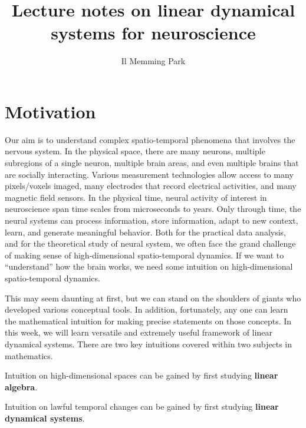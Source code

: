 \documentclass[a4paper,11pt]{exam}
\title{Lecture notes on linear dynamical systems for neuroscience}
\author{Il Memming Park}
\newcounter{ct}
\begin{document}
\maketitle
\section{Motivation}
Our aim is to understand complex spatio-temporal phenomena that involves the nervous system.
In the physical space, there are many neurons, multiple subregions of a single neuron, multiple brain areas, and even multiple brains that are socially interacting.
Various measurement technologies allow access to many pixels/voxels imaged, many electrodes that record electrical activities, and many magnetic field sensors.
In the physical time, neural activity of interest in neuroscience span time scales from microseconds to years.
Only through time, the neural systems can process information, store information, adapt to new context, learn, and generate meaningful behavior.
Both for the practical data analysis, and for the theoretical study of neural system, we often face the grand challenge of making sense of high-dimensional spatio-temporal dynamics.
If we want to ``understand'' how the brain works, we need some intuition on high-dimensional spatio-temporal dynamics.

This may seem daunting at first, but we can stand on the shoulders of giants who developed various conceptual tools.
In addition, fortunately, any one can learn the mathematical intuition for making precise statements on those concepts.
In this week, we will learn versatile and extremely useful framework of linear dynamical systems.
There are two key intuitions covered within two subjects in mathematics.
\begin{tcolorbox}[colback=black!1!,title=Learning Objective 1]
    Intuition on high-dimensional spaces can be gained by first studying \textbf{linear algebra}.
\end{tcolorbox}
\begin{tcolorbox}[colback=black!1!,title=Learning Objective 2]
    Intuition on lawful temporal changes can be gained by first studying \textbf{linear dynamical systems}.
\end{tcolorbox}
\end{document}
